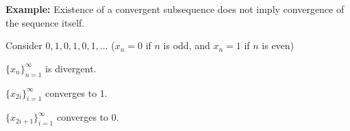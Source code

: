\documentclass[10pt,aspectratio=169]{beamer}
\begin{document}
\begin{frame}

\textbf{Example:}
Existence of a convergent subsequence does not imply
convergence of the sequence itself.

\medskip
\pause
Consider $0,1,0,1,0,1,\ldots$ \quad
($x_n = 0$ if $n$ is odd, and $x_n = 1$ if $n$ is even)

\medskip
\pause

$\{ x_n \}_{n=1}^\infty$ is divergent.

\medskip
\pause

$\{ x_{2i} \}_{i=1}^\infty$ converges to 1.

\medskip
\pause

$\{ x_{2i+1} \}_{i=1}^\infty$ converges to 0.
\end{frame}
\end{document}
